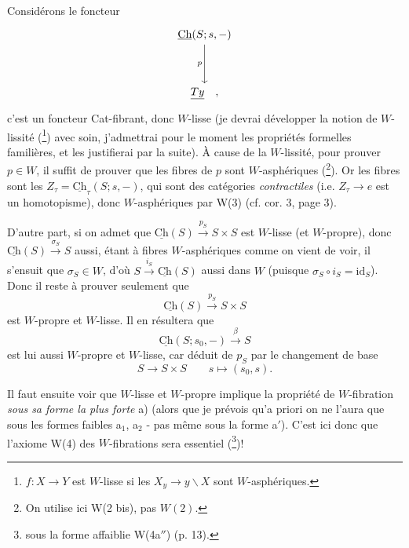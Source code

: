 \documentclass[11pt]{article}
\newcommand{\printedpage}[1]{\marginpar{\footnotesize p.~#1}}
\newcommand{\msp}[1]{\marginpar{\footnotesize [#1]}}
\newcommand{\Ch}{\underline{\mathrm{Ch}}}
\begin{document}
Considérons le foncteur
\[
\begin{tikzcd}[row sep=huge]
\Ch(S; s, -) \arrow[d, "p"'] \\
\underline{Ty} \quad ,
\end{tikzcd}
\]
\printedpage{8}
c'est un foncteur Cat-fibrant, donc $W$-lisse (je devrai développer la notion de $W$-lissité (\footnote[13]{$f : X \longrightarrow Y$ est $W$-lisse si les $X_y \longrightarrow y\backslash X$ sont $W$-asphériques.}) avec soin, j'admettrai pour le moment les propriétés formelles familières, et les justifierai par la suite). À cause de la $W$-lissité, pour prouver $p \in W$, il suffit de
\msp{page 9}
prouver que les fibres de $p$ sont $W$-asphériques (\footnote[14]{On utilise ici W(2 bis), pas $W(2)$.}). Or les fibres sont les $Z_\tau = \Ch_\tau(S; s, -)$, qui sont des catégories \textit{contractiles} (i.e. $Z_\tau \longrightarrow e$ est un homotopisme), donc $W$-asphériques par W(3) (cf. cor. 3, page 3).

D'autre part, si on admet que $\Ch(S) \xrightarrow{p_S} S{\times}S$ est $W$-lisse (et $W$-propre), donc $\Ch(S) \xrightarrow{\sigma_S} S$ aussi, étant à fibres $W$-asphériques comme on vient de voir, il s'ensuit que $\sigma_S \in W$, d'où $S \xrightarrow{i_S} \Ch(S)$ aussi dans $W$ (puisque $\sigma_S \circ i_S = \mathrm{id}_S$). Donc il reste à prouver seulement que
\[ \Ch(S) \xrightarrow{p_S} S \times S \tag*{$(*)$} \]
est $W$-propre et $W$-lisse. Il en résultera que
\[ \Ch(S; s_0, -) \xrightarrow{\beta} S \]
est lui aussi $W$-propre et $W$-lisse, car déduit de $p_S$ par le changement de base
\[ S \longrightarrow S \times S \qquad s \longmapsto (s_0, s). \]

Il faut ensuite voir que $W$-lisse et $W$-propre implique la propriété de $W$-fibration \textit{sous sa forme la plus forte} a) (alors que je prévois qu'a priori on ne l'aura que sous les formes faibles a$_1$, a$_2$ - pas même sous la forme a$'$). C'est ici donc que l'axiome W(4) des $W$-fibrations sera essentiel (\footnote[15]{sous la forme affaiblie W(4a$''$) (p. 13).})!
\end{document}
